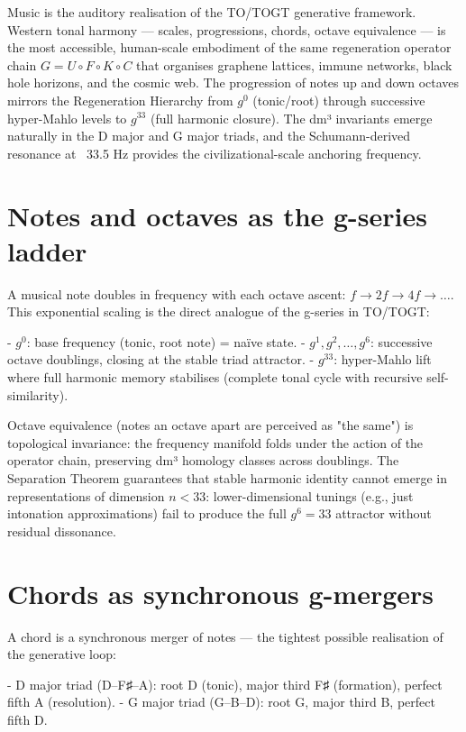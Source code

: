 \documentclass[19pt]{book}
\theoremstyle{plain}
\theoremstyle{definition}
\theoremstyle{remark}
\begin{document}
\begin{enumerate}
Music is the auditory realisation of the TO/TOGT generative framework. Western tonal harmony — scales, progressions, chords, octave equivalence — is the most accessible, human-scale embodiment of the same regeneration operator chain \( G = U \circ F \circ K \circ C \) that organises graphene lattices, immune networks, black hole horizons, and the cosmic web. The progression of notes up and down octaves mirrors the Regeneration Hierarchy from \( g^0 \) (tonic/root) through successive hyper-Mahlo levels to \( g^{33} \) (full harmonic closure). The dm³ invariants emerge naturally in the D major and G major triads, and the Schumann-derived resonance at ~33.5 Hz provides the civilizational-scale anchoring frequency.

\section{Notes and octaves as the g-series ladder}

A musical note doubles in frequency with each octave ascent: \( f \to 2f \to 4f \to \dots \). This exponential scaling is the direct analogue of the g-series in TO/TOGT:

- \( g^0 \): base frequency (tonic, root note) = naïve state.
- \( g^1, g^2, \dots, g^6 \): successive octave doublings, closing at the stable triad attractor.
- \( g^{33} \): hyper-Mahlo lift where full harmonic memory stabilises (complete tonal cycle with recursive self-similarity).

Octave equivalence (notes an octave apart are perceived as "the same") is topological invariance: the frequency manifold folds under the action of the operator chain, preserving dm³ homology classes across doublings. The Separation Theorem guarantees that stable harmonic identity cannot emerge in representations of dimension \( n < 33 \): lower-dimensional tunings (e.g., just intonation approximations) fail to produce the full \( g^6 = 33 \) attractor without residual dissonance.

\section{Chords as synchronous g-mergers}

A chord is a synchronous merger of notes — the tightest possible realisation of the generative loop:

- D major triad (D–F♯–A): root D (tonic), major third F♯ (formation), perfect fifth A (resolution).
- G major triad (G–B–D): root G, major third B, perfect fifth D.


\end{enumerate}
\end{document}
